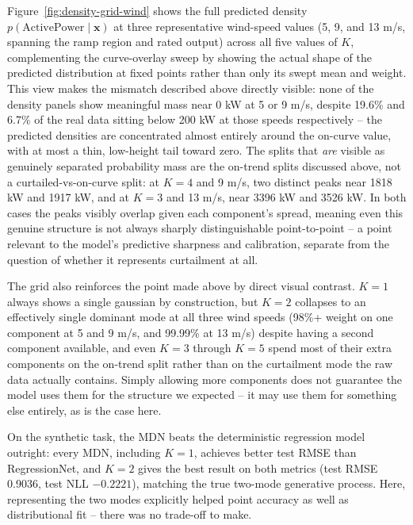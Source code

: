 Figure~\ref{fig:density-grid-wind} shows the full predicted density $p(\text{ActivePower} \mid \mathbf{x})$ at three representative wind-speed values (5, 9, and 13 m/s, spanning the ramp region and rated output) across all five values of $K$, complementing the curve-overlay sweep by showing the actual shape of the predicted distribution at fixed points rather than only its swept mean and weight.
This view makes the mismatch described above directly visible: none of the density panels show meaningful mass near 0 kW at 5 or 9 m/s, despite 19.6\% and 6.7\% of the real data sitting below 200 kW at those speeds respectively -- the predicted densities are concentrated almost entirely around the on-curve value, with at most a thin, low-height tail toward zero.
The splits that \emph{are} visible as genuinely separated probability mass are the on-trend splits discussed above, not a curtailed-vs-on-curve split: at $K=4$ and 9 m/s, two distinct peaks near 1818 kW and 1917 kW, and at $K=3$ and 13 m/s, near 3396 kW and 3526 kW.
In both cases the peaks visibly overlap given each component's spread, meaning even this genuine structure is not always sharply distinguishable point-to-point -- a point relevant to the model's predictive sharpness and calibration, separate from the question of whether it represents curtailment at all.

The grid also reinforces the point made above by direct visual contrast.
$K=1$ always shows a single gaussian by construction, but $K=2$ collapses to an effectively single dominant mode at all three wind speeds (98\%+ weight on one component at 5 and 9 m/s, and 99.99\% at 13 m/s) despite having a second component available, and even $K=3$ through $K=5$ spend most of their extra components on the on-trend split rather than on the curtailment mode the raw data actually contains.
Simply allowing more components does not guarantee the model uses them for the structure we expected -- it may use them for something else entirely, as is the case here.


On the synthetic task, the MDN beats the deterministic regression model outright: every MDN, including $K=1$, achieves better test RMSE than RegressionNet, and $K=2$ gives the best result on both metrics (test RMSE 0.9036, test NLL $-0.2221$), matching the true two-mode generative process.
Here, representing the two modes explicitly helped point accuracy as well as distributional fit -- there was no trade-off to make.

